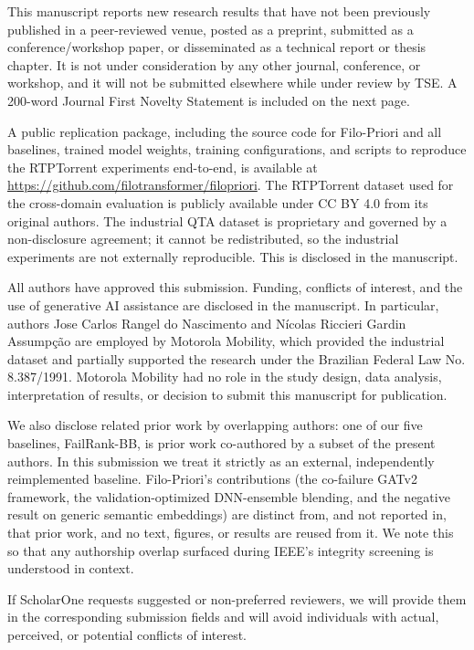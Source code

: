 \documentclass[11pt]{article}
\begin{document}
This manuscript reports new research results that have not been previously
published in a peer-reviewed venue, posted as a preprint, submitted as a
conference/workshop paper, or disseminated as a technical report or thesis
chapter. It is not under consideration by any other journal, conference, or
workshop, and it will not be submitted elsewhere while under review by TSE. A
200-word Journal First Novelty Statement is included on the next page.

A public replication package, including the source code for Filo-Priori and
all baselines, trained model weights, training configurations, and scripts to
reproduce the RTPTorrent experiments end-to-end, is available at
\url{https://github.com/filotransformer/filopriori}. The RTPTorrent dataset
used for the cross-domain evaluation is publicly available under CC BY 4.0 from
its original authors. The industrial QTA dataset is proprietary and governed by
a non-disclosure agreement; it cannot be redistributed, so the industrial
experiments are not externally reproducible. This is disclosed in the
manuscript.

All authors have approved this submission. Funding, conflicts of interest, and
the use of generative AI assistance are disclosed in the manuscript. In
particular, authors Jose Carlos Rangel do Nascimento and Nícolas Riccieri
Gardin Assumpção are employed by Motorola Mobility, which provided the
industrial dataset and partially supported the research under the Brazilian
Federal Law No. 8.387/1991. Motorola Mobility had no role in the study design,
data analysis, interpretation of results, or decision to submit this manuscript
for publication.

We also disclose related prior work by overlapping authors: one of our five
baselines, FailRank-BB, is prior work co-authored by a subset of the present
authors. In this submission we treat it strictly as an external, independently
reimplemented baseline. Filo-Priori's contributions (the co-failure GATv2
framework, the validation-optimized DNN-ensemble blending, and the negative
result on generic semantic embeddings) are distinct from, and not reported in,
that prior work, and no text, figures, or results are reused from it. We note
this so that any authorship overlap surfaced during IEEE's integrity screening
is understood in context.

If ScholarOne requests suggested or non-preferred reviewers, we will provide
them in the corresponding submission fields and will avoid individuals with
actual, perceived, or potential conflicts of interest.
\end{document}
